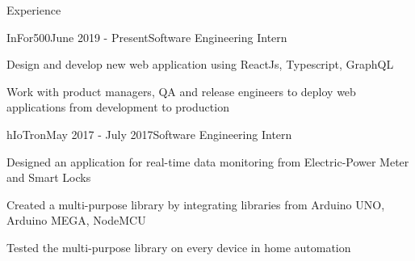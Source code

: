 \documentclass{resume} %
\begin{document}
\begin{rSection}{Experience}

\begin{rSubsection}{InFor500}{June 2019 - Present}{Software Engineering Intern}{}
  \item Design and develop new web application using ReactJs, Typescript, GraphQL 
  \item Work with product managers, QA and release engineers to deploy web applications from development to production
  
\end{rSubsection}

\begin{rSubsection}{hIoTron}{May 2017 - July 2017}{Software Engineering Intern}{}
\item Designed an application for real-time data monitoring from Electric-Power Meter and Smart Locks 
  \item Created a multi-purpose library by integrating libraries from Arduino UNO, Arduino MEGA, NodeMCU
  \item Tested the multi-purpose library on every device in home automation

\end{rSubsection}

\end{rSection}


\end{document}
